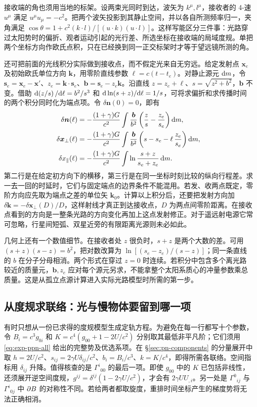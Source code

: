 接收端的角也须用当地的标架。设两束光同时到达，波矢为 $k^\mu,l^\mu$，接收者的 4-速 $u^\mu$ 满足 $u^\mu u_\mu=-c^2$。把两个波矢投影到其静止空间，并以各自所测频率归一，夹角满足 $\cos\theta=1+c^2(k\cdot l)/[(u\cdot k)(u\cdot l)]$。这样写能区分三件事：光路穿过太阳势时的偏折、观者运动引起的光行差、所选坐标在接收端的局域度规。单把两个坐标方向作欧氏点积，只在已经换到同一正交标架时才等于望远镜所测的角。

还可把前面的光线积分实际做到接收点，而不假定光来自无穷远。给定发射点 $\bm x_e$ 及初始欧氏单位方向 $\bm k$，用零阶直线参数 $\ell=c(t-t_e)$。对静止源元 $\dd m$，令 $\bm s_e=\bm x_e-\bm x'$、$z_e=\bm k\cdot\bm s_e$、$\bm b=\bm s_e-z_e\bm k$。沿直线 $z=z_e+\ell$、$s=\sqrt{z^2+b^2}$，$\bm b$ 不变。借助 $\dd(z/s)/\dd\ell=b^2/s^3$ 和 $\dd\ln(s+z)/\dd\ell=1/s$，可将求偏折和求传播时间的两个积分同时化为端点项。令 $\delta\bm n(0)=0$，即有
\begin{align*}
 \delta\bm n(\ell)&=-\frac{(1+\gamma)G}{c^2}\int
           \frac{\bm b}{b^2}\left(\frac{z}{s}-\frac{z_e}{s_e}\right)\dd m,\\
 \delta\bm x_\perp(\ell)&=-\frac{(1+\gamma)G}{c^2}\int
           \frac{\bm b}{b^2}\left(s-s_e-\ell\,\frac{z_e}{s_e}\right)\dd m,\\
 \delta x_\parallel(\ell)&=-\frac{(1+\gamma)G}{c^2}\int
           \ln\frac{s+z}{s_e+z_e}\,\dd m .
\end{align*}
第二行是在给定初方向下的横移，第三行是在同一坐标时刻比较的纵向行程差。求一去一回的时延时，它们与固定端点的边界条件不能混用。若发、收两点既定，零阶方向应先取为端点之差的单位矢 $\bm k_0$。计算以上积分后，还要把发射方向加 $\delta\bm k=-\delta\bm x_\perp(D)/D$，这样射线才真正到达接收点，$D$ 为两点间零阶距离。在接收点看到的方向是一整条光路的方向变化再加上这点发射修正。对于遥远射电源它常可忽略，行星间短弧、双星近旁的有限距离光源则未必如此。

几何上还有一个数值细节。在接收者处 $z$ 很负时，$s+z$ 是两个大数的差。可用 $(s+z)(s-z)=b^2$，把对数改算为 $\ln[(s_e-z_e)/(s-z)]$；同一条直线的 $b$ 在分子分母相消。两个形式在穿过 $z=0$ 时连续。若积分中包含多个离光路较近的质量元，$\bm b,z_e$ 应对每个源元另求，不能拿整个太阳系质心的冲量参数乘总质量。这是从孤立点源计算进入实际光路模型时所需的第一步。

\subsection{从度规求联络：光与慢物体要留到哪一项}

有时只想从一份已求得的度规模型生成定轨方程。为避免在每一行都写十个参数，令 $B_i=c^3g_{0i}$ 和 $K=c^4(g_{00}+1-2U/c^2)$ 分别取其最低非平凡阶；它们须用 \eqref{eq:exp-ppn-all} 给出的完整势及优选系项。在 \S\ref{sec:pn-components} 的分量展开中取 $h=2U/c^2$、$s_{ij}=2\gamma U\delta_{ij}/c^2$、$b_i=B_i/c^3$、$k=K/c^4$，即得所需各联络。空间指标用 $\delta_{ij}$ 升降。值得核查的是 $\Gamma^i{}_{00}$ 的最后一项。即使 $g_{00}$ 中的 $K$ 已包括非线性，还须展开逆空间度规，$g^{ij}=\delta^{ij}(1-2\gamma U/c^2)$，才会有 $2\gamma UU_{,i}$。另一处是 $\Gamma^0{}_{ij}$ 与 $\Gamma^i{}_{0j}$ 中 $\partial B$ 的对称性不同。若给两者都取旋度，重排时间坐标产生的梯度势将无法正确相消。


